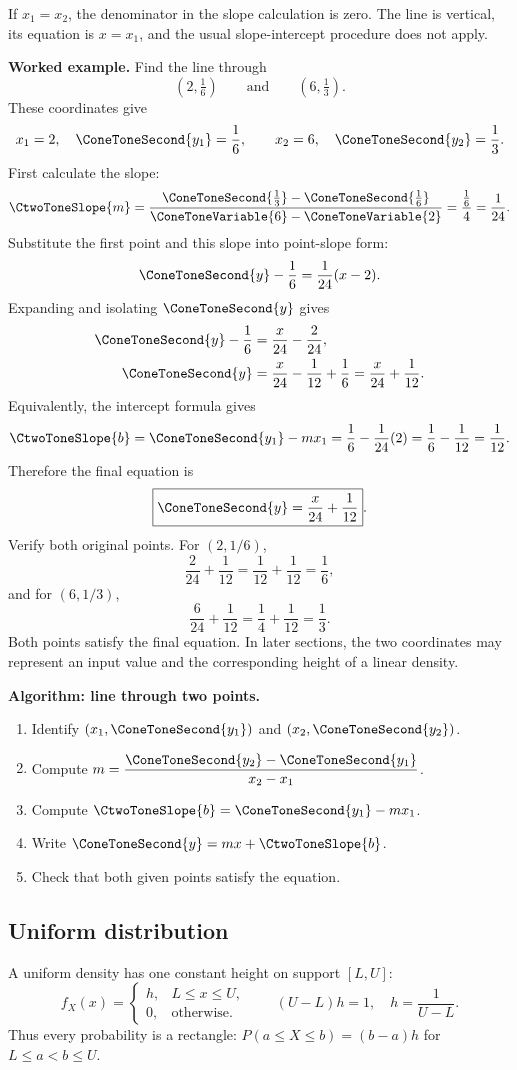 If $x_1=x_2$, the denominator in the slope calculation is zero.  The line is
vertical, its equation is $x=x_1$, and the usual slope-intercept procedure does
not apply.

\textbf{Worked example.} Find the line through
\[
 (2,\tfrac16)\qquad\text{and}\qquad(6,\tfrac13).
\]
These coordinates give
\[
 x_1=2,\quad \ConeToneSecond{y_1}=\frac16,\qquad
 x_2=6,\quad \ConeToneSecond{y_2}=\frac13.
\]
First calculate the slope:
\[
 \CtwoToneSlope{m}=\frac{\ConeToneSecond{\frac13}-\ConeToneSecond{\frac16}}{\ConeToneVariable{6}-\ConeToneVariable{2}}
   =\frac{\frac16}{4}=\frac1{24}.
\]
Substitute the first point and this slope into point-slope form:
\[
 \ConeToneSecond{y}-\frac16=\frac1{24}(x-2).
\]
Expanding and isolating $\ConeToneSecond{y}$ gives
\[
 \begin{aligned}
 \ConeToneSecond{y}-\frac16&=\frac{x}{24}-\frac2{24},\\
 \ConeToneSecond{y}&=\frac{x}{24}-\frac1{12}+\frac16
   =\frac{x}{24}+\frac1{12}.
 \end{aligned}
\]
Equivalently, the intercept formula gives
\[
 \CtwoToneSlope{b}=\ConeToneSecond{y_1}-mx_1=\frac16-\frac1{24}(2)
  =\frac16-\frac1{12}=\frac1{12}.
\]
Therefore the final equation is
\[
 \boxed{\ConeToneSecond{y}=\frac{x}{24}+\frac1{12}}.
\]
Verify both original points.  For $(2,1/6)$,
\[
 \frac2{24}+\frac1{12}=\frac1{12}+\frac1{12}=\frac16,
\]
and for $(6,1/3)$,
\[
 \frac6{24}+\frac1{12}=\frac14+\frac1{12}=\frac13.
\]
Both points satisfy the final equation.  In later sections, the two coordinates
may represent an input value and the corresponding height of a linear density.

\textbf{Algorithm: line through two points.}
\begin{enumerate}
 \item Identify $(x_1,\ConeToneSecond{y_1})$ and $(x_2,\ConeToneSecond{y_2})$.
 \item Compute $\displaystyle m=\frac{\ConeToneSecond{y_2}-\ConeToneSecond{y_1}}{x_2-x_1}$.
 \item Compute $\displaystyle \CtwoToneSlope{b}=\ConeToneSecond{y_1}-mx_1$.
 \item Write $\displaystyle \ConeToneSecond{y}=mx+\CtwoToneSlope{b}$.
 \item Check that both given points satisfy the equation.
\end{enumerate}

\subsection{Uniform distribution}\label{sec:c2-intro-uniform}
A uniform density has one constant height on support $[L,U]$:
\[
 f_X(x)=\begin{cases}h,&L\le x\le U,\\0,&\text{otherwise.}\end{cases}
 \qquad (U-L)h=1,\quad h=\frac1{U-L}.
\]
Thus every probability is a rectangle: $P(a\le X\le b)=(b-a)h$ for
$L\le a<b\le U$.

